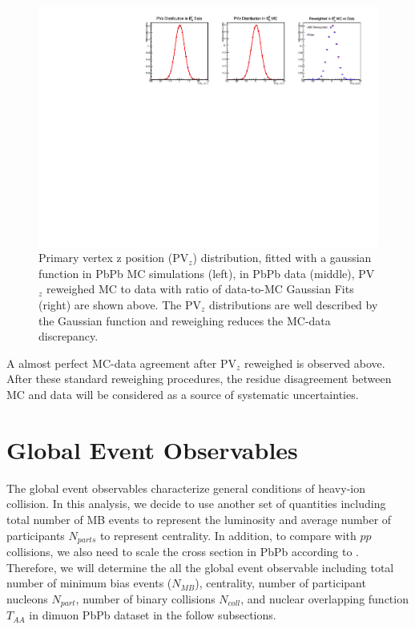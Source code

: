\begin{figure}
\begin{center}
\includegraphics[width= 1.10\textwidth]{Figures/Chapter5/PVzWeightPbPb.pdf}
\caption{Primary vertex z position (PV$_{z}$) distribution, fitted with a gaussian function in PbPb MC simulations (left), in PbPb data (middle), PV$_{z}$ reweighed MC to data with ratio of data-to-MC Gaussian Fits (right) are shown above. The PV$_z$ distributions are well described by the Gaussian function and reweighing reduces the MC-data discrepancy.}
\label{PVZPlot}
\end{center}
\end{figure}

A almost perfect MC-data agreement after PV$_{z}$ reweighed is observed above. After these standard reweighing procedures, the residue disagreement between MC and data will be considered as a source of systematic uncertainties.


\clearpage

\section{Global Event Observables} 

The global event observables characterize general conditions of heavy-ion collision. In this analysis, we decide to use another set of quantities including total number of MB events to represent the luminosity and average number of participants $N_{parts}$ to represent centrality. In addition, to compare with $pp$ collisions, we also need to scale the cross section in PbPb according to . Therefore, we will determine the all the global event observable including total number of minimum bias events ($N_{MB}$), centrality, number of participant nucleons $N_{part}$, number of binary collisions $N_{coll}$, and nuclear overlapping function $T_{AA}$ in dimuon PbPb dataset in the follow subsections.


